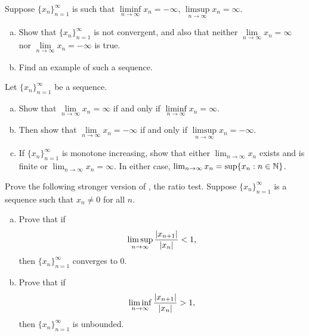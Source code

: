 \begin{exercise}[Easy] \label{exercise:infseqlimex}
\pagebreak[2]
Suppose $\{ x_n \}_{n=1}^\infty$ is such that $\liminf\limits_{n\to\infty} x_n = -\infty$,
$\limsup\limits_{n\to\infty} x_n = \infty$.
\begin{enumerate}[a)]
\item
Show that $\{ x_n \}_{n=1}^\infty$ is not convergent, and also
that neither $\lim\limits_{n\to\infty} x_n = \infty$
nor $\lim\limits_{n\to\infty} x_n = -\infty$
is true.
\item
Find an example of such a sequence.
\end{enumerate}
\end{exercise}

\begin{exercise} \label{exercise:infseqlimlims}
Let $\{ x_n \}_{n=1}^\infty$ be a sequence.
\begin{enumerate}[a)]
\item
Show that
$\lim\limits_{n\to\infty} x_n = \infty$ if and only if
$\liminf\limits_{n\to\infty} x_n = \infty$.
\item
Then show that $\lim\limits_{n\to\infty} x_n = - \infty$ if and only if
$\limsup\limits_{n\to\infty} x_n = -\infty$.
\item
If $\{ x_n \}_{n=1}^\infty$ is monotone increasing, show that either
$\lim_{n\to\infty} x_n$ exists and is finite or $\lim_{n\to\infty} x_n = \infty$.  In either
case, $\lim_{n\to\infty} x_n = \sup \{ x_n : n \in {\mathbb{N}} \}$.
\end{enumerate}
\end{exercise}

\begin{exercise} \label{exercise:strongerratiotest2}
Prove the following stronger version of , the ratio
test.
Suppose $\{ x_n \}_{n=1}^\infty$ is a sequence such that $x_n \not= 0$ for all
$n$.
\begin{enumerate}[a)]
\item
Prove that if
\begin{equation*}
\limsup_{n \to \infty} \frac{\left\lvert {x_{n+1}} \right\rvert}{\left\lvert {x_n} \right\rvert} < 1 ,
\end{equation*}
then $\{ x_n \}_{n=1}^\infty$ converges to $0$.
\item
Prove that if
\begin{equation*}
\liminf_{n \to \infty} \frac{\left\lvert {x_{n+1}} \right\rvert}{\left\lvert {x_n} \right\rvert} > 1 ,
\end{equation*}
then $\{ x_n \}_{n=1}^\infty$ is unbounded.
\end{enumerate}
\end{exercise}


